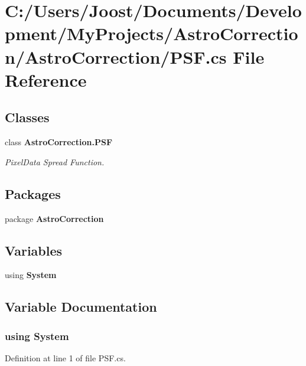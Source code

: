 \section{C:/Users/Joost/Documents/Development/MyProjects/AstroCorrection/AstroCorrection/PSF.cs File Reference}
\label{_p_s_f_8cs}
\subsection*{Classes}
\begin{DoxyCompactItemize}
\item 
class {\bf AstroCorrection.PSF}
\begin{DoxyCompactList}\small\item\em PixelData Spread Function. \item\end{DoxyCompactList}\end{DoxyCompactItemize}
\subsection*{Packages}
\begin{DoxyCompactItemize}
\item 
package {\bf AstroCorrection}
\end{DoxyCompactItemize}
\subsection*{Variables}
\begin{DoxyCompactItemize}
\item 
﻿using {\bf System}
\end{DoxyCompactItemize}


\subsection{Variable Documentation}
\subsubsection[{System}]{\setlength{\rightskip}{0pt plus 5cm}﻿using {\bf System}}\label{_p_s_f_8cs_a81a223a02c34d82b47199f08308847f2}


Definition at line 1 of file PSF.cs.